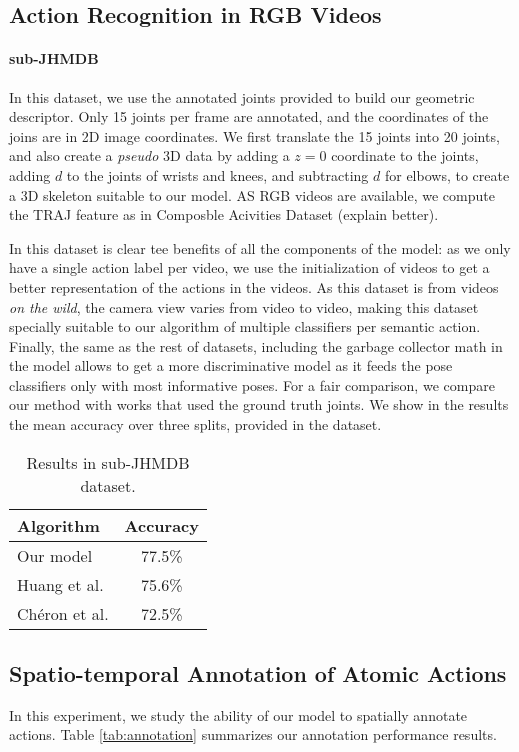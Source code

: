 \subsection{Action Recognition in RGB Videos}

 \paragraph{sub-JHMDB} In this dataset, we use the annotated joints provided to build our geometric descriptor. Only 15 joints per frame are annotated, and the coordinates of the joins are in 2D image coordinates. We first translate the 15 joints into 20 joints, and also create a \emph{pseudo} 3D data by adding a $z=0$ coordinate to the joints, adding $d$ to the joints of wrists and knees, and subtracting $d$ for elbows, to create a 3D skeleton suitable to our model. AS RGB videos are available, we compute the TRAJ feature as in Composble Acivities Dataset (explain better).

In this dataset is clear tee benefits of all the components of the model: as we only have a single action label per video, we use the initialization of videos to get a better representation of the actions in the videos. As this dataset is from videos \emph{on the wild}, the camera view varies from video to video, making this dataset specially suitable to our algorithm of multiple classifiers per semantic action. Finally, the same as the rest of datasets, including the garbage collector math in the model allows to get a more discriminative model as it feeds the pose classifiers only with most informative poses. For a fair comparison, we compare our method with works that used the ground truth joints. We show in the results the mean accuracy over three splits, provided in the dataset.

\begin{table}
\footnotesize
\centering
\begin{tabular}{|l|c|}
\hline
\textbf{Algorithm} & \textbf{Accuracy}\\
\hline
Our model &  77.5\% \\
\hline
Huang et al. \cite{Jhuang2013} & 75.6\% \\
Ch\'eron et al. \cite{Cheron2015} & 72.5\%\\
\hline
\end{tabular}
\caption{Results in sub-JHMDB dataset. }
\end{table}


\subsection{Spatio-temporal Annotation of Atomic Actions}
In this experiment, we study the ability of our model to spatially annotate
actions. Table \ref{tab:annotation} summarizes our annotation performance
results.


